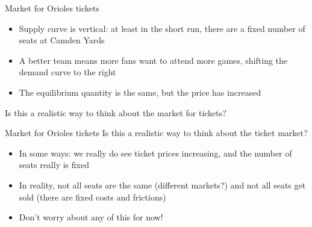 \documentclass[aspectratio=169]{beamer}
\begin{document}
\begin{frame}{Market for Orioles tickets}
    \begin{itemize}
        \item Supply curve is vertical: at least in the short run, there are a fixed number of seats at Camden Yards
        \item A better team means more fans want to attend more games, shifting the demand curve to the right
        \item The equilibrium quantity is the same, but the price has increased
    \end{itemize}

    Is this a realistic way to think about the market for tickets?
\end{frame}

\begin{frame}{Market for Orioles tickets}
    Is this a realistic way to think about the ticket market?
    \begin{itemize}
        \item In some ways: we really do see ticket prices increasing, and the number of seats really is fixed
        \item In reality, not all seats are the same (different markets?) and not all seats get sold (there are fixed costs and frictions)
        \item Don't worry about any of this for now!
    \end{itemize}
\end{frame}
\end{document}
